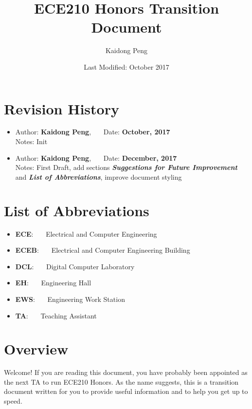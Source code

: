\documentclass[12pt]{article}
\title{ECE210 Honors Transition Document}
\author{Kaidong Peng} %
\date{Last Modified: October 2017} %
\makeatletter
\renewcommand\tableofcontents{%
  \null\hfill\textbf{\Large\contentsname}\hfill\null\par
  \@mkboth{\MakeUppercase\contentsname}{\MakeUppercase\contentsname}%
  \@starttoc{toc}%
}
\newcommand{\RevisionHistoryItem}[3]{
    \item {
        Author: \textbf{#1}, \ \ \  Date: \textbf{#2}
    } \\
    Notes: #3
}
\newcommand{\AbbreviationItem}[2]{
    \item {
        \textbf{#1}: \ \ \ {#2}
    } 
}
\makeatother
\begin{document}
\null  %
\nointerlineskip  %
\vfill
\let\snewpage \newpage
\let\newpage \relax
\maketitle
\let \newpage \snewpage
\vfill
\newpage

\tableofcontents
\newpage

\section*{Revision History}
    \begin{itemize}
        \RevisionHistoryItem{Kaidong Peng}{October, 2017}
        {Init}
        \RevisionHistoryItem{Kaidong Peng}{December, 2017}
        {First Draft, add sections \textbf{\textit{Suggestions for Future Improvement}} and \textbf{\textit{List of Abbreviations}}, improve document styling}
    \end{itemize}

\newpage

\section*{List of Abbreviations}
    \begin{itemize}
        \AbbreviationItem{ECE}{Electrical and Computer Engineering}
        \AbbreviationItem{ECEB}{Electrical and Computer Engineering Building}
        \AbbreviationItem{DCL}{Digital Computer Laboratory}
        \AbbreviationItem{EH}{Engineering Hall}
        \AbbreviationItem{EWS}{Engineering Work Station}
        \AbbreviationItem{TA}{Teaching Assistant}
    \end{itemize}

\newpage

\section{Overview}
    Welcome! If you are reading this document, you have probably been appointed as the next TA to run ECE210 Honors. As the name suggests, this is a transition document written for you to provide useful information and to help you get up to speed.
\end{document}
